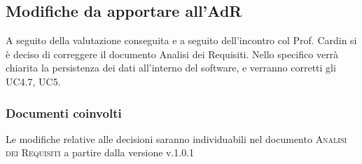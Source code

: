 \documentclass{article}
\begin{document}
\subsection{Modifiche da apportare all’AdR}
\label{itm:3}

A seguito della valutazione conseguita e a seguito dell’incontro col Prof. Cardin si è deciso di correggere il documento Analisi dei Requisiti. Nello specifico verrà chiarita la persistenza dei dati all’interno del software, e verranno corretti gli UC4.7, UC5. \\
\subsubsection*{Documenti coinvolti}
Le modifiche relative alle decisioni saranno individuabili nel documento \textsc{Analisi dei Requisiti} a partire dalla versione v.1.0.1
\end{document}

